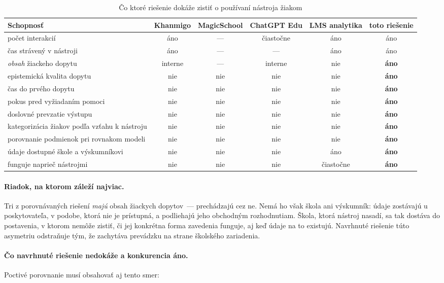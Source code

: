 \begin{table}[H]
\centering
\caption{Čo ktoré riešenie dokáže zistiť o používaní nástroja žiakom}
\label{tab:porovnanie}
\scriptsize
\begin{tabularx}{\textwidth}{@{}X c c c c c@{}}
\toprule
\textbf{Schopnosť} & \textbf{Khanmigo} & \textbf{MagicSchool} & \textbf{ChatGPT Edu} & \textbf{LMS analytika} & \textbf{toto riešenie} \\
\midrule
počet interakcií & áno & --- & čiastočne & áno & áno \\
čas strávený v nástroji & áno & --- & --- & áno & áno \\
\emph{obsah} žiackeho dopytu & interne & --- & interne & nie & \textbf{áno} \\
epistemická kvalita dopytu & nie & nie & nie & nie & \textbf{áno} \\
čas do prvého dopytu & nie & nie & nie & nie & \textbf{áno} \\
pokus pred vyžiadaním pomoci & nie & nie & nie & nie & \textbf{áno} \\
doslovné prevzatie výstupu & nie & nie & nie & nie & \textbf{áno} \\
kategorizácia žiakov podľa vzťahu k nástroju & nie & nie & nie & nie & \textbf{áno} \\
porovnanie podmienok pri rovnakom modeli & nie & nie & nie & nie & \textbf{áno} \\
údaje dostupné škole a výskumníkovi & nie & nie & nie & áno & \textbf{áno} \\
funguje naprieč nástrojmi & nie & nie & nie & čiastočne & \textbf{áno} \\
\bottomrule
\end{tabularx}
\end{table}

\paragraph{Riadok, na ktorom záleží najviac.} Tri z porovnávaných riešení \emph{majú} obsah žiackych dopytov~--- prechádzajú cez ne. Nemá ho však škola ani výskumník: údaje zostávajú u poskytovateľa, v podobe, ktorá nie je prístupná, a podliehajú jeho obchodným rozhodnutiam. Škola, ktorá nástroj nasadí, sa tak dostáva do postavenia, v ktorom nemôže zistiť, či jej konkrétna forma zavedenia funguje, aj keď údaje na to existujú. Navrhnuté riešenie túto asymetriu odstraňuje tým, že zachytáva prevádzku na strane školského zariadenia.

\paragraph{Čo navrhnuté riešenie nedokáže a konkurencia áno.} Poctivé porovnanie musí obsahovať aj tento smer:

